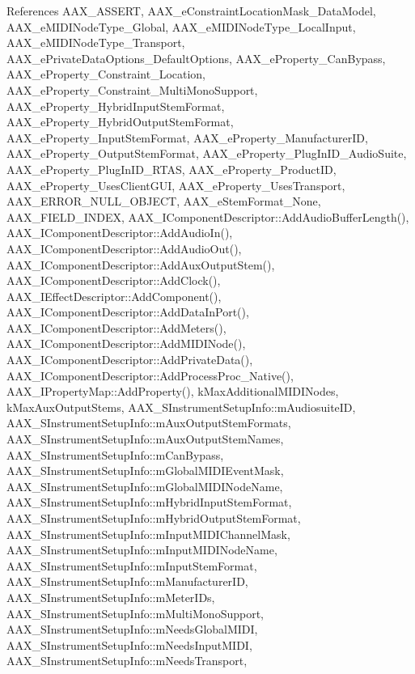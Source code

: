References A\+A\+X\+\_\+\+A\+S\+S\+E\+RT, A\+A\+X\+\_\+e\+Constraint\+Location\+Mask\+\_\+\+Data\+Model, A\+A\+X\+\_\+e\+M\+I\+D\+I\+Node\+Type\+\_\+\+Global, A\+A\+X\+\_\+e\+M\+I\+D\+I\+Node\+Type\+\_\+\+Local\+Input, A\+A\+X\+\_\+e\+M\+I\+D\+I\+Node\+Type\+\_\+\+Transport, A\+A\+X\+\_\+e\+Private\+Data\+Options\+\_\+\+Default\+Options, A\+A\+X\+\_\+e\+Property\+\_\+\+Can\+Bypass, A\+A\+X\+\_\+e\+Property\+\_\+\+Constraint\+\_\+\+Location, A\+A\+X\+\_\+e\+Property\+\_\+\+Constraint\+\_\+\+Multi\+Mono\+Support, A\+A\+X\+\_\+e\+Property\+\_\+\+Hybrid\+Input\+Stem\+Format, A\+A\+X\+\_\+e\+Property\+\_\+\+Hybrid\+Output\+Stem\+Format, A\+A\+X\+\_\+e\+Property\+\_\+\+Input\+Stem\+Format, A\+A\+X\+\_\+e\+Property\+\_\+\+Manufacturer\+ID, A\+A\+X\+\_\+e\+Property\+\_\+\+Output\+Stem\+Format, A\+A\+X\+\_\+e\+Property\+\_\+\+Plug\+In\+I\+D\+\_\+\+Audio\+Suite, A\+A\+X\+\_\+e\+Property\+\_\+\+Plug\+In\+I\+D\+\_\+\+R\+T\+AS, A\+A\+X\+\_\+e\+Property\+\_\+\+Product\+ID, A\+A\+X\+\_\+e\+Property\+\_\+\+Uses\+Client\+G\+UI, A\+A\+X\+\_\+e\+Property\+\_\+\+Uses\+Transport, A\+A\+X\+\_\+\+E\+R\+R\+O\+R\+\_\+\+N\+U\+L\+L\+\_\+\+O\+B\+J\+E\+CT, A\+A\+X\+\_\+e\+Stem\+Format\+\_\+\+None, A\+A\+X\+\_\+\+F\+I\+E\+L\+D\+\_\+\+I\+N\+D\+EX, A\+A\+X\+\_\+\+I\+Component\+Descriptor\+::\+Add\+Audio\+Buffer\+Length(), A\+A\+X\+\_\+\+I\+Component\+Descriptor\+::\+Add\+Audio\+In(), A\+A\+X\+\_\+\+I\+Component\+Descriptor\+::\+Add\+Audio\+Out(), A\+A\+X\+\_\+\+I\+Component\+Descriptor\+::\+Add\+Aux\+Output\+Stem(), A\+A\+X\+\_\+\+I\+Component\+Descriptor\+::\+Add\+Clock(), A\+A\+X\+\_\+\+I\+Effect\+Descriptor\+::\+Add\+Component(), A\+A\+X\+\_\+\+I\+Component\+Descriptor\+::\+Add\+Data\+In\+Port(), A\+A\+X\+\_\+\+I\+Component\+Descriptor\+::\+Add\+Meters(), A\+A\+X\+\_\+\+I\+Component\+Descriptor\+::\+Add\+M\+I\+D\+I\+Node(), A\+A\+X\+\_\+\+I\+Component\+Descriptor\+::\+Add\+Private\+Data(), A\+A\+X\+\_\+\+I\+Component\+Descriptor\+::\+Add\+Process\+Proc\+\_\+\+Native(), A\+A\+X\+\_\+\+I\+Property\+Map\+::\+Add\+Property(), k\+Max\+Additional\+M\+I\+D\+I\+Nodes, k\+Max\+Aux\+Output\+Stems, A\+A\+X\+\_\+\+S\+Instrument\+Setup\+Info\+::m\+Audiosuite\+ID, A\+A\+X\+\_\+\+S\+Instrument\+Setup\+Info\+::m\+Aux\+Output\+Stem\+Formats, A\+A\+X\+\_\+\+S\+Instrument\+Setup\+Info\+::m\+Aux\+Output\+Stem\+Names, A\+A\+X\+\_\+\+S\+Instrument\+Setup\+Info\+::m\+Can\+Bypass, A\+A\+X\+\_\+\+S\+Instrument\+Setup\+Info\+::m\+Global\+M\+I\+D\+I\+Event\+Mask, A\+A\+X\+\_\+\+S\+Instrument\+Setup\+Info\+::m\+Global\+M\+I\+D\+I\+Node\+Name, A\+A\+X\+\_\+\+S\+Instrument\+Setup\+Info\+::m\+Hybrid\+Input\+Stem\+Format, A\+A\+X\+\_\+\+S\+Instrument\+Setup\+Info\+::m\+Hybrid\+Output\+Stem\+Format, A\+A\+X\+\_\+\+S\+Instrument\+Setup\+Info\+::m\+Input\+M\+I\+D\+I\+Channel\+Mask, A\+A\+X\+\_\+\+S\+Instrument\+Setup\+Info\+::m\+Input\+M\+I\+D\+I\+Node\+Name, A\+A\+X\+\_\+\+S\+Instrument\+Setup\+Info\+::m\+Input\+Stem\+Format, A\+A\+X\+\_\+\+S\+Instrument\+Setup\+Info\+::m\+Manufacturer\+ID, A\+A\+X\+\_\+\+S\+Instrument\+Setup\+Info\+::m\+Meter\+I\+Ds, A\+A\+X\+\_\+\+S\+Instrument\+Setup\+Info\+::m\+Multi\+Mono\+Support, A\+A\+X\+\_\+\+S\+Instrument\+Setup\+Info\+::m\+Needs\+Global\+M\+I\+DI, A\+A\+X\+\_\+\+S\+Instrument\+Setup\+Info\+::m\+Needs\+Input\+M\+I\+DI, A\+A\+X\+\_\+\+S\+Instrument\+Setup\+Info\+::m\+Needs\+Transport, 